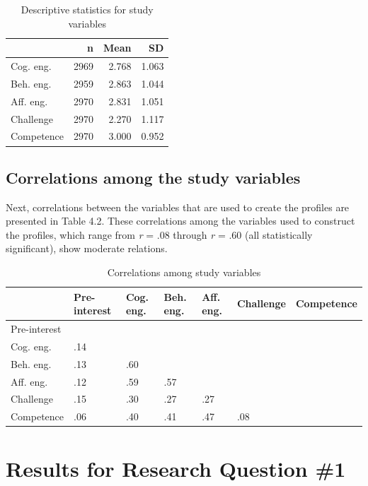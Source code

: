 \documentclass[]{book}
\theoremstyle{definition}
\theoremstyle{definition}
\theoremstyle{definition}
\theoremstyle{remark}
\begin{document}
\begin{table}

\caption{\label{tab:unnamed-chunk-7}Descriptive statistics for study variables}
\centering
\begin{tabular}[t]{lrrr}
\toprule
 & n & Mean & SD\\
\midrule
Cog. eng. & 2969 & 2.768 & 1.063\\
Beh. eng. & 2959 & 2.863 & 1.044\\
Aff. eng. & 2970 & 2.831 & 1.051\\
Challenge & 2970 & 2.270 & 1.117\\
Competence & 2970 & 3.000 & 0.952\\
\bottomrule
\end{tabular}
\end{table}

\subsection{Correlations among the study
variables}\label{correlations-among-the-study-variables}

Next, correlations between the variables that are used to create the
profiles are presented in Table 4.2. These correlations among the
variables used to construct the profiles, which range from \emph{r} =
.08 through \emph{r} = .60 (all statistically significant), show
moderate relations.

\begin{table}

\caption{\label{tab:unnamed-chunk-8}Correlations among study variables}
\centering
\begin{tabular}[t]{lllllll}
\toprule
 & Pre-interest & Cog. eng. & Beh. eng. & Aff. eng. & Challenge & Competence\\
\midrule
Pre-interest &  &  &  &  &  & \\
Cog. eng. & .14 &  &  &  &  & \\
Beh. eng. & .13 & .60 &  &  &  & \\
Aff. eng. & .12 & .59 & .57 &  &  & \\
Challenge & .15 & .30 & .27 & .27 &  & \\
Competence & .06 & .40 & .41 & .47 & .08 & \\
\bottomrule
\end{tabular}
\end{table}

\section{Results for Research Question
\#1}\label{results-for-research-question-1}
\end{document}
